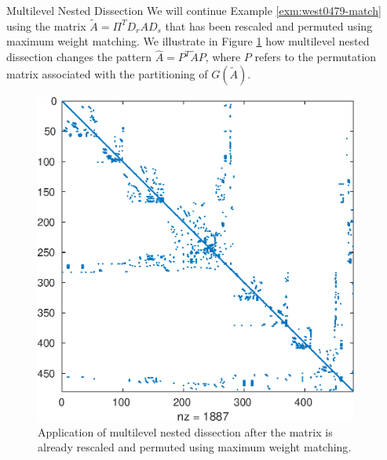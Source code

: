 \begin{example}{Multilevel Nested Dissection}\label{exm:west0479-metis}
We will continue Example \ref{exm:west0479-match} using the matrix
$\tilde A=\Pi^TD_rAD_s$ that has been rescaled and permuted using
maximum weight matching. We illustrate in Figure \ref{fig:metis} 
how multilevel nested dissection changes the pattern $\hat A=P^T \tilde A P$,
where $P$ refers to the permutation matrix associated with the partitioning
of $G(\tilde A)$.
\end{example}
\begin{figure}
 \centering
\begin{minipage}{.55\textwidth}
  \begin{center}
\includegraphics[width=0.95\textwidth]{figures/west0479-match-metis} 
 \end{center}  
\end{minipage}
    \caption{Application of multilevel
nested dissection after the matrix is already rescaled and permuted using maximum weight matching.}
    \label{fig:metis}
\end{figure}

